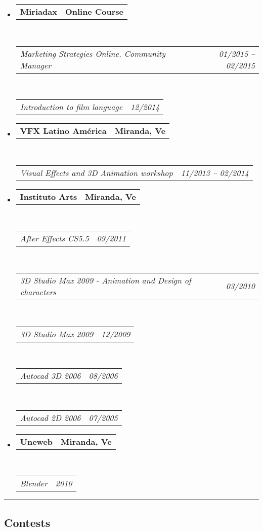 \documentclass[10pt,letterpaper]{article}
\makeatletter
\newcommand{\headerrow}[2]
{\begin{tabular*}{\linewidth}{l@{\extracolsep{\fill}}r}
	#1 &
	#2 \\
\end{tabular*}}
\makeatother
\begin{document}
\begin{itemize}
	\parskip=0.1em

\item 
   \headerrow
   {\textbf{Miriadax}}
   {\textbf{Online Course}}
  \\
  \headerrow
   {\emph{Marketing Strategies Online. Community Manager}}
   {\emph{01/2015 -- 02/2015}}
  \\
  \headerrow
   {\emph{Introduction to film language}}
   {\emph{12/2014}}
\item 
   \headerrow
   {\textbf{VFX Latino América}}
   {\textbf{Miranda, Ve}}
  \\
  \headerrow
   {\emph{Visual Effects and 3D Animation workshop}}
   {\emph{11/2013 -- 02/2014}}

\item 
   \headerrow
   {\textbf{Instituto Arts}}
   {\textbf{Miranda, Ve}}
	\\
	\headerrow
   {\emph{After Effects CS5.5}}
   {\emph{09/2011}}
	\\
	\headerrow
   {\emph{3D Studio Max 2009 - Animation and Design of characters}}
   {\emph{03/2010}}
	\\
	\headerrow
   {\emph{3D Studio Max 2009}}
   {\emph{12/2009}}
	\\
	\headerrow
   {\emph{Autocad 3D 2006 }}
   {\emph{08/2006}}
	\\
	\headerrow
   {\emph{Autocad 2D 2006}}
   {\emph{07/2005}}

\item 
   \headerrow
   {\textbf{Uneweb}}
   {\textbf{Miranda, Ve}}
	\\
	\headerrow
   {\emph{Blender}}
   {\emph{2010}}
\end{itemize}



\hrule
\vspace{-0.4em}
\subsection*{Contests}
\end{document}
